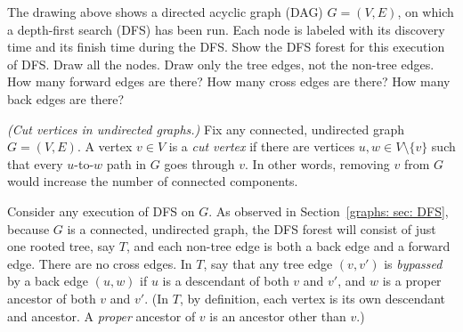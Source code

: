 \documentclass[11pt]{article}
\begin{document}
\begin{center}
\end{center}

The drawing above shows a directed acyclic graph (DAG) $G=(V,E)$,
on which a depth-first search (DFS) has been run.
Each node is labeled with  its discovery time and its finish time during the DFS.
Show the DFS forest for this execution of DFS.
Draw all the nodes.
Draw only the tree edges, not the non-tree edges.
How many forward edges are there?  
How many cross edges are there? 
How many back edges are there? 

\exercise \emph{(Cut vertices in undirected graphs.)}
Fix any connected, undirected graph $G=(V,E)$.
A vertex $v\in V$ is a \emph{cut vertex}
if there are vertices
$u,w\in V\setminus\{v\}$
such that every $u$-to-$w$ path in $G$ goes through $v$.
In other words, removing $v$ from $G$ would increase the number of connected components.

Consider any execution of DFS on $G$.
As observed in Section~\ref{graphs: sec: DFS},
because $G$ is a connected, undirected graph,
the DFS forest will consist of just one rooted tree, say $T$,
and each non-tree edge is both a back edge and a forward edge.
There are no cross edges.
In $T$, say that any tree edge $(v, v')$ is \emph{bypassed} 
by a back edge $(u, w)$ if $u$ is a descendant of both $v$ and $v'$,
and $w$ is a proper ancestor of both $v$ and $v'$.
(In $T$, by definition, each vertex is its own descendant and ancestor.
A \emph{proper} ancestor of $v$ is an ancestor other than $v$.)
\end{document}
